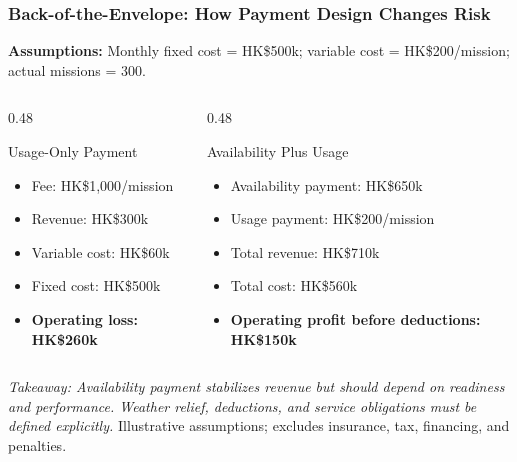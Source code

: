 \documentclass{beamer}
\begin{document}
\begin{frame}[t,shrink=12]
\frametitle{Back-of-the-Envelope: How Payment Design Changes Risk}
\textbf{Assumptions:} Monthly fixed cost = HK\$500k; variable cost = HK\$200/mission; actual missions = 300.
\begin{columns}[T]
\begin{column}{0.48\textwidth}\begin{block}{Usage-Only Payment}
\begin{itemize}
\item Fee: HK\$1,000/mission
\item Revenue: HK\$300k
\item Variable cost: HK\$60k
\item Fixed cost: HK\$500k
\item \textbf{Operating loss: HK\$260k}
\end{itemize}\end{block}\end{column}
\begin{column}{0.48\textwidth}\begin{block}{Availability Plus Usage}
\begin{itemize}
\item Availability payment: HK\$650k
\item Usage payment: HK\$200/mission
\item Total revenue: HK\$710k
\item Total cost: HK\$560k
\item \textbf{Operating profit before deductions: HK\$150k}
\end{itemize}\end{block}\end{column}
\end{columns}
\textit{Takeaway: Availability payment stabilizes revenue but should depend on readiness and performance. Weather relief, deductions, and service obligations must be defined explicitly.}
\vfill{\tiny Illustrative assumptions; excludes insurance, tax, financing, and penalties.}
\end{frame}
\end{document}
